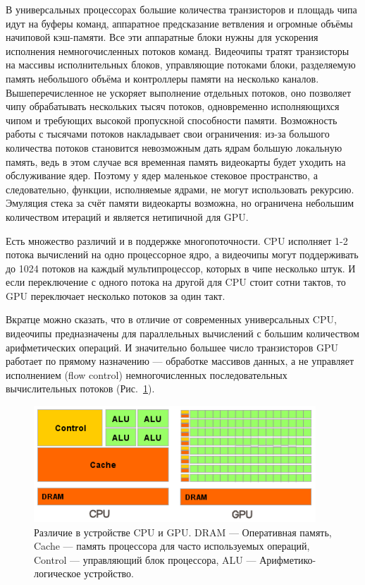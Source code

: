 В универсальных процессорах большие количества транзисторов и площадь чипа идут на буферы команд, аппаратное предсказание ветвления и огромные объёмы начиповой кэш-памяти. Все эти аппаратные блоки нужны для ускорения исполнения немногочисленных потоков команд. Видеочипы тратят транзисторы на массивы исполнительных блоков, управляющие потоками блоки, разделяемую память небольшого объёма и контроллеры памяти на несколько каналов. Вышеперечисленное не ускоряет выполнение отдельных потоков, оно позволяет чипу обрабатывать нескольких тысяч потоков, одновременно исполняющихся чипом и требующих высокой пропускной способности памяти. Возможность работы с тысячами потоков накладывает свои ограничения: из-за большого количества потоков становится невозможным дать ядрам большую локальную память, ведь в этом случае вся временная память видеокарты будет уходить на обслуживание ядер. Поэтому у ядер маленькое стековое пространство, а следовательно, функции, исполняемые ядрами, не могут использовать рекурсию. Эмуляция стека за счёт памяти видеокарты возможна, но ограничена небольшим количеством итераций и является нетипичной для GPU.

Есть множество различий и в поддержке многопоточности. CPU исполняет 1-2 потока вычислений на одно процессорное ядро, а видеочипы могут поддерживать до 1024 потоков на каждый мультипроцессор, которых в чипе несколько штук. И если переключение с одного потока на другой для CPU стоит сотни тактов, то GPU переключает несколько потоков за один такт.

Вкратце можно сказать, что в отличие от современных универсальных CPU, видеочипы предназначены для параллельных вычислений с большим количеством арифметических операций. И значительно большее число транзисторов GPU работает по прямому назначению — обработке массивов данных, а не управляет исполнением (flow control) немногочисленных последовательных вычислительных потоков (Рис.~\ref{ris:gpucpu}). 

\begin{figure}[ht!]
\begin{center}
\includegraphics[width=0.8\linewidth]{img/cpu_vs_gpu.png}
\caption{Различие в устройстве CPU и GPU. DRAM --- Оперативная память, Cache --- память процессора для часто используемых операций, Control --- управляющий блок процессора, ALU --- Арифметико-логическое устройство.}
\label{ris:gpucpu}
\end{center}
\end{figure}


